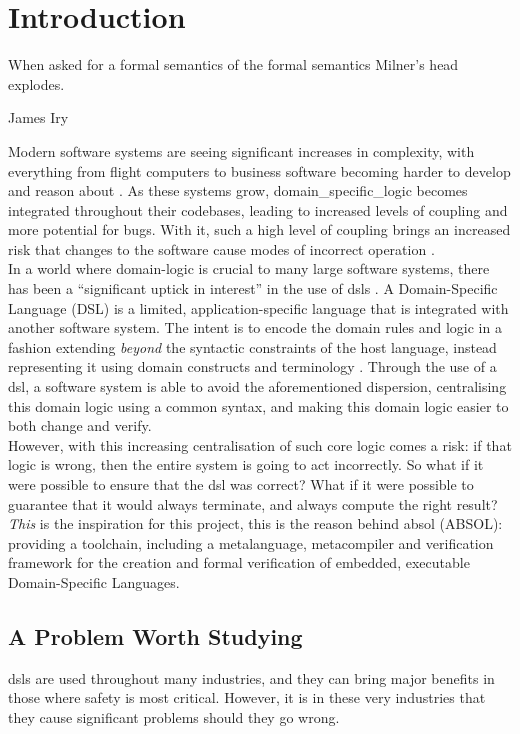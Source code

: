 \chapter{Introduction} %
\label{cha:introduction}
\epigraph{When asked for a formal semantics of the formal semantics Milner's head explodes.}{James Iry \citep{incomplete_iry}}

Modern software systems are seeing significant increases in complexity, with everything from flight computers to business software becoming harder to develop and reason about \citep{dvorak2009nasa}.
As these systems grow, \gls{domain_specific_logic} becomes integrated throughout their codebases, leading to increased levels of \gls{coupling} and more potential for bugs.
With it, such a high level of coupling brings an increased risk that changes to the software cause modes of incorrect operation \citep{khawar2001developing}.\\

In a world where domain-logic is crucial to many large software systems, there has been a ``significant uptick in interest'' in the use of \glspl{dsl} \citep{fowler2010domain}.
A Domain-Specific Language (DSL) is a limited, application-specific language that is integrated with another software system.
The intent is to encode the domain rules and logic in a fashion extending \textit{beyond} the syntactic constraints of the host language, instead representing it using domain constructs and terminology \citep{Mernik:2005:DDL:1118890.1118892}.
Through the use of a \gls{dsl}, a software system is able to avoid the aforementioned dispersion, centralising this domain logic using a common syntax, and making this domain logic easier to both change and verify.\\

However, with this increasing centralisation of such core logic comes a risk: if that logic is wrong, then the entire system is going to act incorrectly.
So what if it were possible to ensure that the \gls{dsl} was correct?
What if it were possible to guarantee that it would always terminate, and always compute the right result?
\textit{This} is the inspiration for this project, this is the reason behind \gls{absol} (ABSOL): providing a toolchain, including a \gls{metalanguage}, \gls{metacompiler} and verification framework for the creation and formal verification of embedded, executable Domain-Specific Languages.

\section{A Problem Worth Studying} %
\label{sec:a_problem_worth_studying}
\glspl{dsl} are used throughout many industries, and they can bring major benefits in those where safety is most critical.
However, it is in these very industries that they cause significant problems should they go wrong.\\

